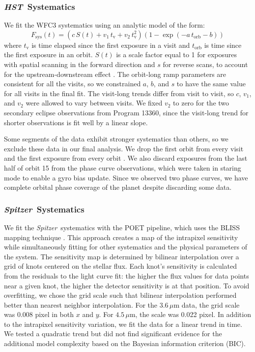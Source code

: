 \documentclass[twocolumn]{aastex61}
\newcommand{\project}[1]{\textsl{#1}}
\newcommand{\HST}{\project{HST}}
\newcommand{\Spitzer}{\project{Spitzer}}
\begin{document}
\subsubsection{\HST\ Systematics}
\label{sec:hst_sys}
We fit the WFC3 systematics using an analytic model of the form:
\begin{equation}
 F_\mathrm{sys}(t) = (c\,S(t) + v_1\,t_\mathrm{v} + v_2\,t_\mathrm{v}^2)(1 - \exp(-a\,t_\mathrm{orb} - b))
\end{equation}
where $t_\mathrm{v}$ is time elapsed since the first exposure in a visit and $t_\mathrm{orb}$ is time since the first exposure in an orbit. $S(t)$ is a scale factor equal to 1 for exposures with spatial scanning in the forward direction and $s$ for reverse scans, to account for the upstream-downstream effect \citep{mccullough12}. The orbit-long ramp parameters are consistent for all the visits, so we constrained $a$, $b$, and $s$ to have the same value for all visits in the final fit. The visit-long trends differ from visit to visit, so $c$, $v_1$, and $v_2$ were allowed to vary between visits. We fixed $v_2$ to zero for the two secondary eclipse observations from Program 13360, since the visit-long trend for shorter observations is fit well by a linear slope.

Some segments of the data exhibit stronger systematics than others, so we exclude these data in our final analysis. We drop the first orbit from every visit and the first exposure from every orbit \citep[following common practice; see e.g.][]{kreidberg14a}.  We also discard exposures from the last half of orbit 15 from the phase curve observations, which were taken in staring mode to enable a gyro bias update. Since we observed two phase curves, we have complete orbital phase coverage of the planet despite discarding some data.

\subsubsection{\Spitzer\ Systematics}
We fit the \Spitzer\ systematics with the POET pipeline, which uses the BLISS mapping technique \citep{stevenson12}. This approach creates a map of the intrapixel sensitivity while simultaneously fitting for other systematics and the physical parameters of the system. The sensitivity map is determined by bilinear interpolation over a grid of knots centered on the stellar flux. Each knot's sensitivity is calculated from the residuals to the light curve fit: the higher the flux values for data points near a given knot, the higher the detector sensitivity is at that position.  To avoid overfitting, we chose the grid scale such that bilinear interpolation performed better than nearest neighbor interpolation. For the $3.6\,\mu$m data, the grid scale was 0.008 pixel in both $x$ and $y$. For $4.5\,\mu$m, the scale was 0.022 pixel.  In addition to the intrapixel sensitivity variation, we fit the data for a linear trend in time. We tested a quadratic trend but did not find significant evidence for the additional model complexity based on the Bayesian information criterion (BIC). 
\end{document}
